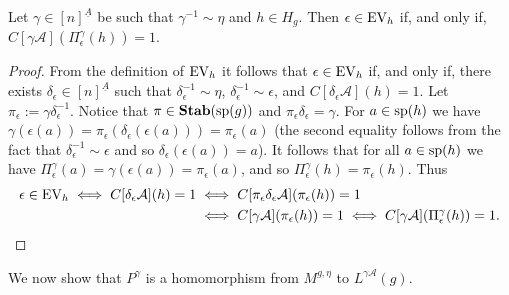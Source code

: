 \documentclass[../main/thesis.tex]{subfiles}
\begin{document}

\begin{lem}
	Let $\gamma\in [n]^{\underline{A}}$ be such that $\gamma^{-1} \sim \eta$ and
  $h \in H_g$. Then $\epsilon \in \text{EV}_h$ if, and only if, $C[\gamma
  \mathcal{A}](\Pi^{\gamma}_{\epsilon} (h)) = 1$.
  \label{lem:translate-EV-circuits}
\end{lem}
\begin{proof}
  From the definition of $\text{EV}_h$ it follows that $\epsilon \in \text{EV}_h$ if, and
  only if, there exists $\delta_{\epsilon} \in [n]^{\underline{A}}$ such that
  $\delta^{-1}_{\epsilon} \sim \eta$, $\delta^{-1}_{\epsilon} \sim \epsilon$,
  and $C[\delta_{\epsilon} \mathcal{A}](h) = 1$. Let $\pi_{\epsilon} := \gamma
  \delta^{-1}_{\epsilon}$. Notice that $\pi \in \text{\textbf{Stab}} (\text{sp} (g))$ and $\pi_{\epsilon}
  \delta_{\epsilon} = \gamma$. For $a \in \text{sp}(h)$ we have $\gamma
  (\epsilon(a)) = \pi_{\epsilon} (\delta_{\epsilon} (\epsilon (a))) =
  \pi_{\epsilon}(a)$ (the second equality follows from the fact that
  $\delta^{-1}_{\epsilon} \sim \epsilon$ and so $\delta_{\epsilon} (\epsilon
  (a)) = a$). It follows that for all $a \in \text{sp}(h)$ we have
  $\Pi^{\gamma}_\epsilon (a) = \gamma (\epsilon (a)) = \pi_{\epsilon}(a)$, and
  so $\Pi^{\gamma}_{\epsilon}(h) = \pi_{\epsilon}(h)$. Thus
  \begin{align*}
    \epsilon \in \text{EV}_h \iff C[\delta_{\epsilon} \mathcal{A}](h) = 1 
    & \iff C[\pi_\epsilon \delta_{\epsilon} \mathcal{A}](\pi_{\epsilon} (h)) = 1 \\
    & \iff C[\gamma \mathcal{A}](\pi_{\epsilon} (h)) = 1 
      \iff C[\gamma \mathcal{A}](\Pi^{\gamma}_{\epsilon}(h)) = 1.
  \end{align*}
\end{proof}

We now show that $P^{\gamma}$ is a homomorphism from $M^{g, \eta}$ to $L^{\gamma
  \mathcal{A}}(g)$.
\end{document}
